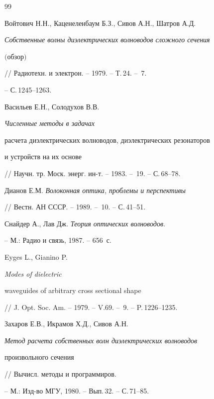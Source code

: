 \begin{thebibliography}{99}






Войтович Н.Н., Каценеленбаум Б.З., Сивов А.Н., Шатров А.Д.


{\em Собственные волны диэлектрических волноводов сложного сечения


$($обзор$)$} // Радиотехн. и электрон. -- 1979. -- Т.\,24. -- \No\,7.


-- С.\,1245--1263.






Васильев Е.Н., Солодухов В.В. {\em Численные методы в задачах


расчета диэлектрических волноводов, диэлектрических резонаторов


и устройств на их основе}


// Научн. тр. Моск. энерг. ин-т. -- 1983. -- \No\,19. -- С.\,68--78.






Дианов Е.М. {\em Волоконная оптика, проблемы и перспективы}


// Вестн. АН СССР. -- 1989. -- \No\,10. -- С.\,41--51.






Снайдер А., Лав Дж. {\em Теория оптических волноводов}. 


-- М.: Радио и связь, 1987. -- 656~с.






Eyges L., Gianino P. {\em Modes of dielectric


waveguides of arbitrary cross sectional shape}


// J. Opt. Soc. Am. -- 1979. -- V.69. -- \No\,9. -- P.\,1226--1235.






Захаров Е.В., Икрамов Х.Д., Сивов А.Н.


{\em Метод расчета собственных волн диэлектрических волноводов


произвольного сечения} // Вычисл. методы и программиров. 


-- М.: Изд-во МГУ, 1980. -- Вып.\,32. -- С.\,71--85.



\end{thebibliography}
